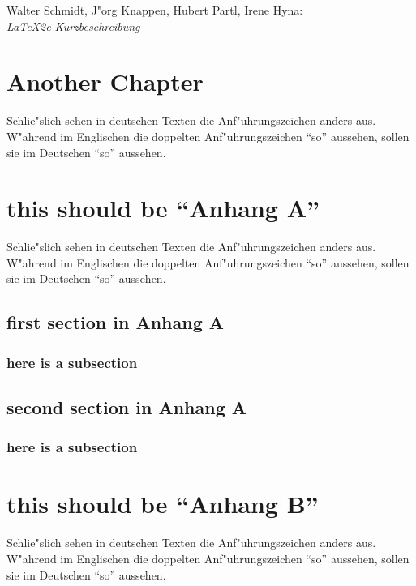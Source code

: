 \documentclass[11pt]{report} %
\begin{document}
\begin{thebibliography}{9} 
 
Walter Schmidt, J"org Knappen, Hubert Partl, Irene Hyna:\\
\textit{LaTeX2e-Kurzbeschreibung}

\chapter{Another Chapter}

Schlie"slich sehen in deutschen Texten die Anf"uhrungszeichen anders
aus. W"ahrend im Englischen die doppelten Anf"uhrungszeichen ``so''
aussehen, sollen sie im Deutschen "`so"' aussehen. 

\appendix

\chapter{this should be ``Anhang A''}

Schlie"slich sehen in deutschen Texten die Anf"uhrungszeichen anders
aus. W"ahrend im Englischen die doppelten Anf"uhrungszeichen ``so''
aussehen, sollen sie im Deutschen "`so"' aussehen. 

\section{first section in Anhang A}

\subsection{here is a subsection}

\section{second section in Anhang A}

\subsection{here is a subsection}

\chapter{this should be ``Anhang B''}

Schlie"slich sehen in deutschen Texten die Anf"uhrungszeichen anders
aus. W"ahrend im Englischen die doppelten Anf"uhrungszeichen ``so''
aussehen, sollen sie im Deutschen "`so"' aussehen. 

\end{thebibliography}
 
\end{document}
